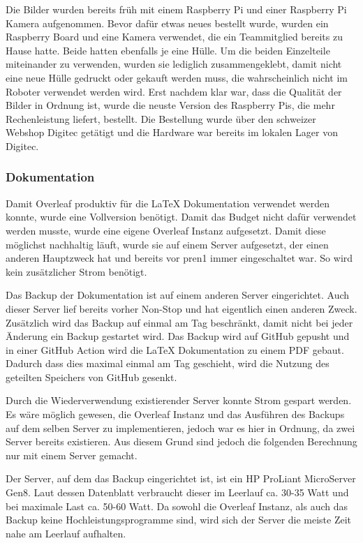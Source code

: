 Die Bilder wurden bereits früh mit einem Raspberry Pi und einer Raspberry Pi Kamera aufgenommen. Bevor dafür etwas neues bestellt wurde, wurden ein Raspberry Board und eine Kamera verwendet, die ein Teammitglied bereits zu Hause hatte. Beide hatten ebenfalls je eine Hülle.
Um die beiden Einzelteile miteinander zu verwenden, wurden sie lediglich zusammengeklebt, damit nicht eine neue Hülle gedruckt oder gekauft werden muss, die wahrscheinlich nicht im Roboter verwendet werden wird.
Erst nachdem klar war, dass die Qualität der Bilder in Ordnung ist, wurde die neuste Version des Raspberry Pis, die mehr Rechenleistung liefert, bestellt. Die Bestellung wurde über den schweizer Webshop Digitec getätigt und die Hardware war bereits im lokalen Lager von Digitec. 

\subsubsection{Dokumentation}

Damit Overleaf produktiv für die LaTeX Dokumentation verwendet werden konnte, wurde eine Vollversion benötigt. Damit das Budget nicht dafür verwendet werden musste, wurde eine eigene Overleaf Instanz aufgesetzt. Damit diese möglichst nachhaltig läuft, wurde sie auf einem Server aufgesetzt, der einen anderen Hauptzweck hat und bereits vor \acrshort{pren1} immer eingeschaltet war. So wird kein zusätzlicher Strom benötigt.

Das Backup der Dokumentation ist auf einem anderen Server eingerichtet. Auch dieser Server lief bereits vorher Non-Stop und hat eigentlich einen anderen Zweck. Zusätzlich wird das Backup auf einmal am Tag beschränkt, damit nicht bei jeder Änderung ein Backup gestartet wird. Das Backup wird auf GitHub gepusht und in einer GitHub Action wird die LaTeX Dokumentation zu einem PDF gebaut. Dadurch dass dies maximal einmal am Tag geschieht, wird die Nutzung des geteilten Speichers von GitHub gesenkt.

Durch die Wiederverwendung existierender Server konnte Strom gespart werden. Es wäre möglich gewesen, die Overleaf Instanz und das Ausführen des Backups auf dem selben Server zu implementieren, jedoch war es hier in Ordnung, da zwei Server bereits existieren. Aus diesem Grund sind jedoch die folgenden Berechnung nur mit einem Server gemacht.

Der Server, auf dem das Backup eingerichtet ist, ist ein HP ProLiant MicroServer Gen8. Laut dessen Datenblatt verbraucht dieser im Leerlauf ca. 30-35 Watt und bei maximale Last ca. 50-60 Watt.\cite{proliant} Da sowohl die Overleaf Instanz, als auch das Backup keine Hochleistungsprogramme sind, wird sich der Server die meiste Zeit nahe am Leerlauf aufhalten.

